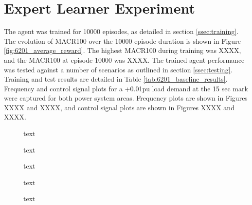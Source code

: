 \section{Expert Learner Experiment}
The agent was trained for 10000 episodes, as detailed in section \ref{ssec:training}. The evolution of MACR100 over the 10000 episode duration is shown in Figure \ref{fig:6201_average_reward}. The highest MACR100 during training was XXXX, and the MACR100 at episode 10000 was XXXX. The trained agent performance was tested against a number of scenarios as outlined in section \ref{ssec:testing}. Training and test results are detailed in Table \ref{tab:6201_baseline_results}. Frequency and control signal plots for a +0.01pu load demand at the 15 sec mark were captured for both power system areas. Frequency plots are shown in Figures XXXX and XXXX, and control signal plots are shown in Figures XXXX and XXXX.

\vspace{2cm}

\begin{figure}[h]
	\centering
	
	\caption{text}
\end{figure}





\begin{figure}[h]
	\centering
	
	
	\caption{text}
	
	
	\caption{text}
	
	
	\caption{text}
				
	
	\caption{text}
\end{figure}